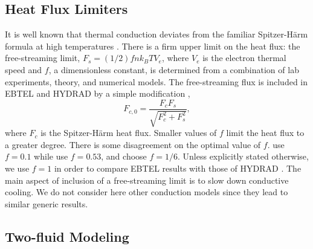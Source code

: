 \subsection{Heat Flux Limiters}\label{hot-plasma:subsec:hf_theory}
    
It is well known that thermal conduction deviates from the familiar Spitzer-H{\"a}rm formula \citep{spitzer_transport_1953} at high temperatures \citep[e.g.][]{ljepojevic_heat_1989}. There is a firm upper limit on the heat flux: the free-streaming limit, $F_s=(1/2)fnk_BTV_e$, where $V_e$ is the electron thermal speed and $f$, a dimensionless constant, is determined from a combination of lab experiments, theory, and numerical models. The free-streaming flux is included in EBTEL and HYDRAD by a simple modification \citep{klimchuk_highly_2008},
\begin{equation}
    F_{c,0} = \frac{F_cF_s}{\sqrt{F_c^2 + F_s^2}},
\end{equation}
where $F_c$ is the Spitzer-H{\"a}rm heat flux. Smaller values of $f$ limit the heat flux to a greater degree. There is some disagreement on the optimal value of $f$. \citet{luciani_nonlocal_1983} use $f=0.1$ while \citet{karpen_nonlocal_1987} use $f=0.53$, and \citet{patsourakos_coronal_2005} choose $f=1/6$. Unless explicitly stated otherwise, we use $f = 1$ in order to compare EBTEL results with those of HYDRAD \citep[see appendix of][]{bradshaw_influence_2013}. The main aspect of inclusion of a free-streaming limit is to slow down conductive cooling. We do not consider here other conduction models \citep[e.g. the non-local model discussed in the coronal context by][]{karpen_nonlocal_1987,ciaravella_non-local_1991,west_lifetime_2008} since they lead to similar generic results.

\subsection{Two-fluid Modeling}\label{hot-plasma:subsec:two_fluid_theory}
    
